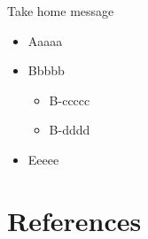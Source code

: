 \documentclass[drafts]{beamer}
\begin{document}
\begin{frame}[t]
{Take home message}
	\begin{itemize}
		\item 
		Aaaaa
		\item 
		Bbbbb
		\begin{itemize}
			\item
			B-ccccc
			\item
			B-dddd
		\end{itemize}
		\item
		Eeeee
	\end{itemize}
\end{frame}



\section{References}
\end{document}

